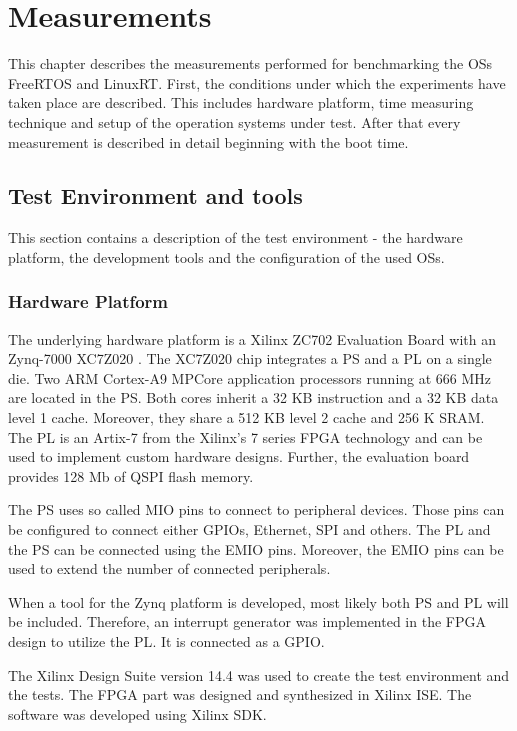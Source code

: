\chapter{Measurements}\label{ch_measurements}
This chapter describes the measurements performed for benchmarking the \acp{OS} FreeRTOS and LinuxRT.
First, the conditions under which the experiments have taken place are described.
This includes hardware platform, time measuring technique and setup of the operation systems under test.
After that every measurement is described in detail beginning with the boot time.

\section{Test Environment and tools}
This section contains a description of the test environment - the hardware platform, the development tools and the configuration of the used \acp{OS}.
\subsection{Hardware Platform}
The underlying hardware platform is a Xilinx ZC702 Evaluation Board \cite{xilinx:zc702_ev_board} with an Zynq-7000 XC7Z020 \cite{xilinx:zynq7000}.
The XC7Z020 chip integrates a \ac{PS} and a \ac{PL} on a single die.
Two ARM Cortex-A9 MPCore application processors running at 666 MHz are located in the \ac{PS}.
Both cores inherit a 32 KB instruction and a 32 KB data level 1 cache.
Moreover, they share a 512 KB level 2 cache and 256 K SRAM.
The \ac{PL} is an Artix-7 from the Xilinx's 7 series FPGA technology and can be used to implement custom hardware designs.
Further, the evaluation board provides 128 Mb of \ac{QSPI} flash memory.
\par
The \ac{PS} uses so called \ac{MIO} pins to connect to peripheral devices.
Those pins can be configured to connect either \acp{GPIO}, Ethernet, \ac{SPI} and others.
The \ac{PL} and the \ac{PS} can be connected using the \ac{EMIO} pins.
Moreover, the \ac{EMIO} pins can be used to extend the number of connected peripherals.
\par
When a tool for the Zynq platform is developed, most likely both \ac{PS} and \ac{PL} will be included.
Therefore, an interrupt generator was implemented in the  \ac{FPGA} design to utilize the \ac{PL}.
It is connected as a \ac{GPIO}.
\par
The Xilinx Design Suite version 14.4 was used to create the test environment and the tests.
The \ac{FPGA} part was designed and synthesized in Xilinx \ac{ISE}.
The software was developed using Xilinx \ac{SDK}.

